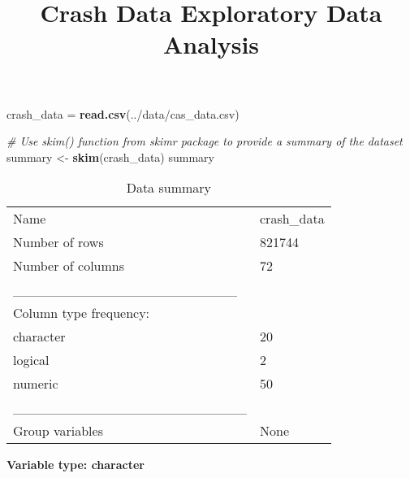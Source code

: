 \documentclass[
]{article}
\title{Crash Data Exploratory Data Analysis}
\author{}
\date{\vspace{-2.5em}}
\newenvironment{Shaded}{\begin{snugshade}}{\end{snugshade}}
\newcommand{\CommentTok}[1]{\textcolor[rgb]{0.56,0.35,0.01}{\textit{#1}}}
\newcommand{\FunctionTok}[1]{\textcolor[rgb]{0.13,0.29,0.53}{\textbf{#1}}}
\newcommand{\NormalTok}[1]{#1}
\newcommand{\OtherTok}[1]{\textcolor[rgb]{0.56,0.35,0.01}{#1}}
\newcommand{\StringTok}[1]{\textcolor[rgb]{0.31,0.60,0.02}{#1}}
\begin{document}
\maketitle

\begin{Shaded}
\begin{Highlighting}[]
\NormalTok{crash\_data }\OtherTok{=} \FunctionTok{read.csv}\NormalTok{(}\StringTok{\textquotesingle{}../data/cas\_data.csv\textquotesingle{}}\NormalTok{)}

\CommentTok{\# Use skim() function from skimr package to provide a summary of the dataset}
\NormalTok{summary }\OtherTok{\textless{}{-}} \FunctionTok{skim}\NormalTok{(crash\_data)}
\NormalTok{summary}
\end{Highlighting}
\end{Shaded}

\begin{longtable}[]{@{}ll@{}}
\caption{Data summary}\tabularnewline
\toprule\noalign{}
\endfirsthead
\endhead
\bottomrule\noalign{}
\endlastfoot
Name & crash\_data \\
Number of rows & 821744 \\
Number of columns & 72 \\
\_\_\_\_\_\_\_\_\_\_\_\_\_\_\_\_\_\_\_\_\_\_\_ & \\
Column type frequency: & \\
character & 20 \\
logical & 2 \\
numeric & 50 \\
\_\_\_\_\_\_\_\_\_\_\_\_\_\_\_\_\_\_\_\_\_\_\_\_ & \\
Group variables & None \\
\end{longtable}

\textbf{Variable type: character}
\end{document}
